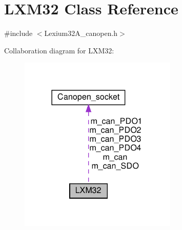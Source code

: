 \hypertarget{class_l_x_m32}{}\section{L\+X\+M32 Class Reference}
\label{class_l_x_m32}


{\ttfamily \#include $<$Lexium32\+A\+\_\+canopen.\+h$>$}



Collaboration diagram for L\+X\+M32\+:
\nopagebreak
\begin{figure}[H]
\begin{center}
\leavevmode
\includegraphics[width=213pt]{class_l_x_m32__coll__graph}
\end{center}
\end{figure}
